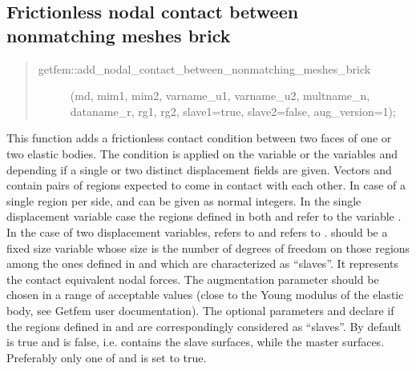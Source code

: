 \documentclass[a4paper,11pt,english]{sphinxmanual}
\begin{document}
\subsection{Frictionless nodal contact between non\sphinxhyphen{}matching meshes brick}
\label{\detokenize{userdoc/model_contact_friction:frictionless-nodal-contact-between-non-matching-meshes-brick}}\begin{quote}
\begin{description}
\item[{getfem::add\_nodal\_contact\_between\_nonmatching\_meshes\_brick}] \leavevmode
(md, mim1, mim2, varname\_u1, varname\_u2, multname\_n, dataname\_r,
rg1, rg2, slave1=true, slave2=false, aug\_version=1);

\end{description}
\end{quote}

This function adds a frictionless contact condition between two faces of one
or two elastic bodies. The condition is applied on the variable  or
the variables  and  depending if a single or
two distinct displacement fields are given. Vectors  and 
contain pairs of regions expected to come in contact with each other. In
case of a single region per side,  and  can be given as normal
integers. In the single displacement variable case the regions defined in
both  and  refer to the variable . In the case of
two displacement variables,  refers to  and  refers
to .  should be a fixed size variable whose size
is the number of degrees of freedom on those regions among the ones
defined in  and  which are characterized as “slaves”. It
represents the contact equivalent nodal forces. The augmentation
parameter  should be chosen in a range of acceptable values (close to
the Young modulus of the elastic body, see Getfem user documentation).
The optional parameters  and  declare if the regions
defined in  and  are correspondingly considered as “slaves”.
By default  is true and  is false, i.e.  contains
the slave surfaces, while  the master surfaces. Preferably only
one of  and  is set to true.
\end{document}
